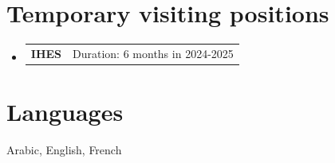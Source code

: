 \documentclass[A4,11pt]{article}
\makeatletter
\newcommand{\CVSubheadingshort}[2]{
  \vspace{-2pt}\item
    \begin{tabular*}{0.97\textwidth}[t]{l@{\extracolsep{\fill}}r}
      \textbf{#1} & #2 \\
    \end{tabular*}\vspace{-7pt}
}
\newcommand{\CVSubHeadingListStart}{\begin{itemize}[leftmargin=0.5cm, label={}]}
\newcommand{\CVSubHeadingListEnd}{\end{itemize}}
\makeatother
\begin{document}
\section{Temporary visiting positions}
\CVSubHeadingListStart
\CVSubheadingshort
{IHES}{Duration: 6 months in 2024-2025}
\CVSubHeadingListEnd


\section{Languages}
\begin{itemize}[leftmargin=0.5cm, label={}]
  \small{\item{Arabic, English, French}\let\thefootnote\relax{}}
\end{itemize}
\end{document}
